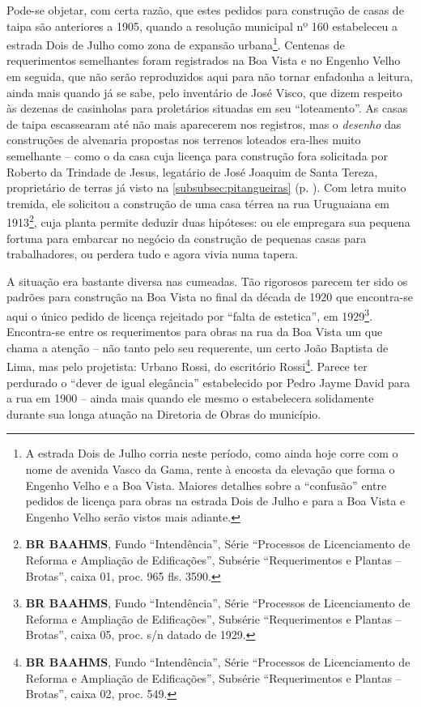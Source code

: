 Pode-se objetar, com certa razão, que estes pedidos para construção de casas de taipa são anteriores a 1905, quando a resolução municipal nº 160 estabeleceu a estrada Dois de Julho como zona de expansão urbana\footnote{A estrada Dois de Julho corria neste período, como ainda hoje corre com o nome de avenida Vasco da Gama, rente à encosta da elevação que forma o Engenho Velho e a Boa Vista. Maiores detalhes sobre a ``confusão'' entre pedidos de licença para obras na estrada Dois de Julho e para a Boa Vista e Engenho Velho serão vistos mais adiante.}. Centenas de requerimentos semelhantes foram registrados na Boa Vista e no Engenho Velho em seguida, que não serão reproduzidos aqui para não tornar enfadonha a leitura, ainda mais quando já se sabe, pelo inventário de José Visco, que dizem respeito às dezenas de casinholas para proletários situadas em seu ``loteamento''. As casas de taipa escassearam até não mais aparecerem nos registros, mas o \textit{desenho} das construções de alvenaria propostas nos terrenos loteados era-lhes muito semelhante -- como o da casa cuja licença para construção fora solicitada por Roberto da Trindade de Jesus, legatário de José Joaquim de Santa Tereza, proprietário de terras já visto na \autoref{subsubsec:pitangueiras} (p. \pageref{subsubsec:pitangueiras}). Com letra muito tremida, ele solicitou a construção de uma casa térrea na rua Uruguaiana em 1913\footnote{\textbf{BR BAAHMS}, Fundo ``Intendência'', Série ``Processos de Licenciamento de Reforma e Ampliação de Edificações'', Subsérie ``Requerimentos e Plantas -- Brotas'', caixa 01, proc. 965 fls. 3590.}, cuja planta permite deduzir duas hipóteses: ou ele empregara sua pequena fortuna para embarcar no negócio da construção de pequenas casas para trabalhadores, ou perdera tudo e agora vivia numa tapera.

A situação era bastante diversa nas cumeadas. Tão rigorosos parecem ter sido os padrões para construção na Boa Vista no final da década de 1920 que encontra-se aqui o único pedido de licença rejeitado por ``falta de estetica'', em 1929\footnote{\textbf{BR BAAHMS}, Fundo ``Intendência'', Série ``Processos de Licenciamento de Reforma e Ampliação de Edificações'', Subsérie ``Requerimentos e Plantas -- Brotas'', caixa 05, proc. s/n datado de 1929.}. Encontra-se entre os requerimentos para obras na rua da Boa Vista um que chama a atenção -- não tanto pelo seu requerente, um certo João Baptista de Lima, mas pelo projetista: Urbano Rossi, do escritório Rossi\footnote{\textbf{BR BAAHMS}, Fundo ``Intendência'', Série ``Processos de Licenciamento de Reforma e Ampliação de Edificações'', Subsérie ``Requerimentos e Plantas -- Brotas'', caixa 02, proc. 549.}. Parece ter perdurado o ``dever de igual elegância'' estabelecido por Pedro Jayme David para a rua em 1900 -- ainda mais quando ele mesmo o estabelecera solidamente durante sua longa atuação na Diretoria de Obras do município.


